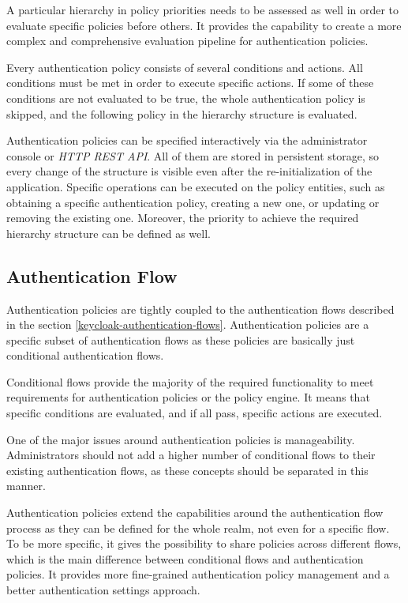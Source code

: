 A particular hierarchy in policy priorities needs to be assessed as well in order to evaluate specific policies before others.
It provides the capability to create a more complex and comprehensive evaluation pipeline for authentication policies.

Every authentication policy consists of several conditions and actions.
All conditions must be met in order to execute specific actions.
If some of these conditions are not evaluated to be true, the whole authentication policy is skipped, and the following policy in the hierarchy structure is evaluated.

Authentication policies can be specified interactively via the administrator console or \textit{HTTP REST API}.
All of them are stored in persistent storage, so every change of the structure is visible even after the re-initialization of the application. 
Specific operations can be executed on the policy entities, such as obtaining a specific authentication policy, creating a new one, or updating or removing the existing one.
Moreover, the priority to achieve the required hierarchy structure can be defined as well.

\newpage

\subsection{Authentication Flow}

Authentication policies are tightly coupled to the authentication flows described in the section \ref{keycloak-authentication-flows}.
Authentication policies are a specific subset of authentication flows as these policies are basically just conditional authentication flows.

Conditional flows provide the majority of the required functionality to meet requirements for authentication policies or the policy engine.
It means that specific conditions are evaluated, and if all pass, specific actions are executed.

One of the major issues around authentication policies is manageability.
Administrators should not add a higher number of conditional flows to their existing authentication flows, as these concepts should be separated in this manner.

Authentication policies extend the capabilities around the authentication flow process as they can be defined for the whole realm, not even for a specific flow.
To be more specific, it gives the possibility to share policies across different flows, which is the main difference between conditional flows and authentication policies.
It provides more fine-grained authentication policy management and a better authentication settings approach.

